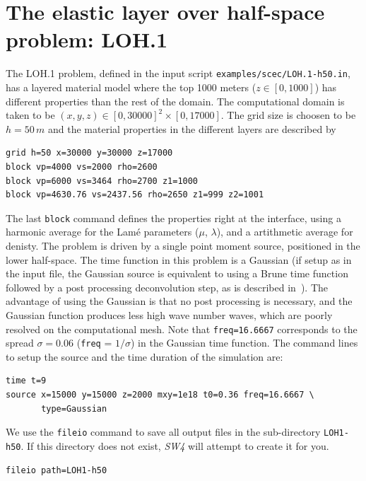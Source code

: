 \documentclass[11pt]{report}
\begin{document}
\section{The elastic layer over half-space problem: LOH.1}
The LOH.1 problem, defined in the input script \verb+examples/scec/LOH.1-h50.in+, has a layered
material model where the top 1000 meters ($z\in [0, 1000]$) has different properties than the rest of the
domain. The computational domain is taken to be $(x,y,z) \in [0,30000]^2\times [0,17000]$. The
grid size is choosen to be $h=50\,m$ and the material properties in the
different layers are described by
\begin{verbatim}
grid h=50 x=30000 y=30000 z=17000
block vp=4000 vs=2000 rho=2600 
block vp=6000 vs=3464 rho=2700 z1=1000
block vp=4630.76 vs=2437.56 rho=2650 z1=999 z2=1001
\end{verbatim}
The last \verb+block+ command defines the properties right at the interface, using a harmonic
average for the Lam\'e parameters ($\mu$, $\lambda$), and a artithmetic average for denisty. The
problem is driven by a single point moment source, positioned in the lower half-space. The time
function in this problem is a Gaussian (if setup as in the input file, the Gaussian source is
equivalent to using a Brune time function followed by a post processing deconvolution step, as is
described in~\cite{Day-2001}). The advantage of using the Gaussian is that no post processing is
necessary, and the Gaussian function produces less high wave number waves, which are poorly resolved
on the computational mesh. Note that \verb+freq=16.6667+ corresponds to the spread $\sigma=0.06$
({\tt freq} = $1/\sigma$) in the Gaussian time function. The command lines to setup the source and
the time duration of the simulation are:
\begin{verbatim}
time t=9
source x=15000 y=15000 z=2000 mxy=1e18 t0=0.36 freq=16.6667 \ 
       type=Gaussian
\end{verbatim}

We use the \verb+fileio+ command to save all output files in the sub-directory
\verb+LOH1-h50+. If this directory does not exist, \emph{SW4} will attempt to create it for you.
\begin{verbatim}
fileio path=LOH1-h50
\end{verbatim}
\end{document}
